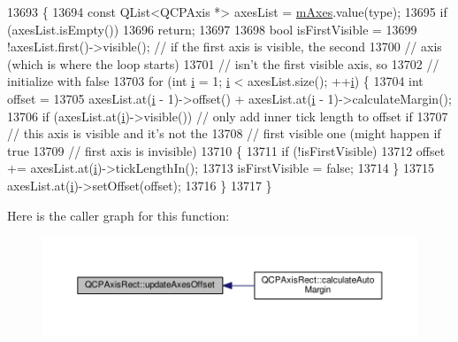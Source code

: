 \begin{DoxyCode}
13693                                                        \{
13694   \textcolor{keyword}{const} QList<QCPAxis *> axesList = \hyperlink{class_q_c_p_axis_rect_ac2cb3ba9a25b733883afc3bd25f7d82b}{mAxes}.value(type);
13695   \textcolor{keywordflow}{if} (axesList.isEmpty())
13696     \textcolor{keywordflow}{return};
13697 
13698   \textcolor{keywordtype}{bool} isFirstVisible =
13699       !axesList.first()->visible(); \textcolor{comment}{// if the first axis is visible, the second}
13700                                     \textcolor{comment}{// axis (which is where the loop starts)}
13701                                     \textcolor{comment}{// isn't the first visible axis, so}
13702                                     \textcolor{comment}{// initialize with false}
13703   \textcolor{keywordflow}{for} (\textcolor{keywordtype}{int} \hyperlink{_comparision_pictures_2_createtest_image_8m_a6f6ccfcf58b31cb6412107d9d5281426}{i} = 1; \hyperlink{_comparision_pictures_2_createtest_image_8m_a6f6ccfcf58b31cb6412107d9d5281426}{i} < axesList.size(); ++\hyperlink{_comparision_pictures_2_createtest_image_8m_a6f6ccfcf58b31cb6412107d9d5281426}{i}) \{
13704     \textcolor{keywordtype}{int} offset =
13705         axesList.at(\hyperlink{_comparision_pictures_2_createtest_image_8m_a6f6ccfcf58b31cb6412107d9d5281426}{i} - 1)->offset() + axesList.at(\hyperlink{_comparision_pictures_2_createtest_image_8m_a6f6ccfcf58b31cb6412107d9d5281426}{i} - 1)->calculateMargin();
13706     \textcolor{keywordflow}{if} (axesList.at(\hyperlink{_comparision_pictures_2_createtest_image_8m_a6f6ccfcf58b31cb6412107d9d5281426}{i})->visible()) \textcolor{comment}{// only add inner tick length to offset if}
13707                                    \textcolor{comment}{// this axis is visible and it's not the}
13708                                    \textcolor{comment}{// first visible one (might happen if true}
13709                                    \textcolor{comment}{// first axis is invisible)}
13710     \{
13711       \textcolor{keywordflow}{if} (!isFirstVisible)
13712         offset += axesList.at(\hyperlink{_comparision_pictures_2_createtest_image_8m_a6f6ccfcf58b31cb6412107d9d5281426}{i})->tickLengthIn();
13713       isFirstVisible = \textcolor{keyword}{false};
13714     \}
13715     axesList.at(\hyperlink{_comparision_pictures_2_createtest_image_8m_a6f6ccfcf58b31cb6412107d9d5281426}{i})->setOffset(offset);
13716   \}
13717 \}
\end{DoxyCode}


Here is the caller graph for this function\+:\nopagebreak
\begin{figure}[H]
\begin{center}
\leavevmode
\includegraphics[width=350pt]{class_q_c_p_axis_rect_a6024ccdc74f5dc0e8a0fe482e5b28a20_icgraph}
\end{center}
\end{figure}


